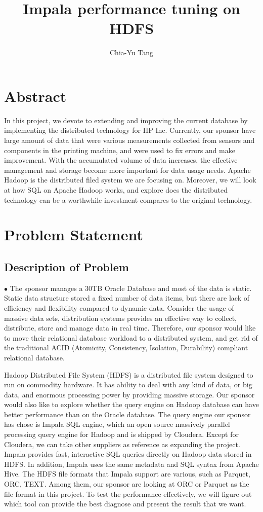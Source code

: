 \documentclass[letterpaper,10pt,fleqn,draftclsnofoot,onecolumn]{IEEEtran}
\title{Impala performance tuning on HDFS }
\author{Chia-Yu Tang }
\begin{document}
	\maketitle
	\hrulefill
	\section*{Abstract}
	In this project, we devote to extending and improving the current database by implementing the distributed technology for HP Inc. Currently, our sponsor have large amount of data that were various measurements collected from sensors and components in the printing machine, and were used to fix errors and make improvement. With the accumulated volume of data increases, the effective management and storage become more important for data usage needs. Apache Hadoop is the distributed filed system we are focusing on. Moreover, we will look at how SQL on Apache Hadoop works, and explore does the distributed technology can be a worthwhile investment compares to the original technology. 
	\newpage
	
	\section*{Problem Statement}
	
	\subsection{Description of Problem}
	$\bullet$ The sponsor manages a 30TB Oracle Database and most of the data is static. Static data structure stored a fixed number of data items, but there are lack of efficiency and flexibility compared to dynamic data. Consider the usage of massive data sets, distribution systems provides an effective way to collect, distribute, store and manage data in real time. Therefore, our sponsor would like to move their relational database workload to a distributed system, and get rid of the traditional ACID (Atomicity, Consistency, Isolation, Durability) compliant relational database. 

Hadoop Distributed File System (HDFS) is a distributed file system designed to run on commodity hardware. It has ability to deal with any kind of data, or big data, and enormous processing power by providing massive storage. Our sponsor would also like to explore whether the query engine on Hadoop database can have better performance than on the Oracle database.
The query engine our sponsor has chose is Impala SQL engine, which an open source massively parallel processing query engine for Hadoop and is shipped by Cloudera. Except for Cloudera, we can take other suppliers as reference as expanding the project. Impala provides fast, interactive SQL queries directly on Hadoop data stored in HDFS. In addition, Impala uses the same metadata and SQL syntax from Apache Hive. The HDFS file formats that Impala support are various, such as Parquet, ORC, TEXT. Among them, our sponsor are looking at ORC or Parquet as the file format in this project. To test the performance effectively, we will figure out which tool can provide the best diagnose and present the result that we want. 
\end{document}
